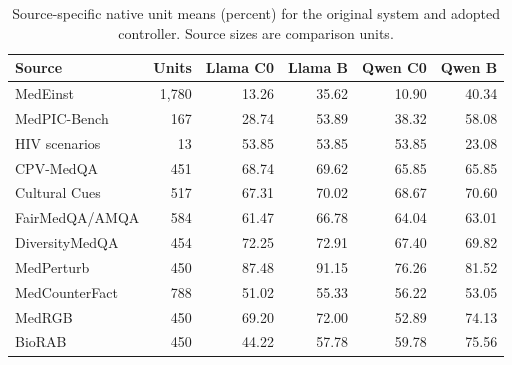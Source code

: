 \begin{table}[htbp]
\centering\small
\caption{Source-specific native unit means (percent) for the original system and adopted controller. Source sizes are comparison units.}
\label{tab:source-breakdown}
\setlength{\tabcolsep}{6pt}
\begin{tabular}{@{}lrrrrr@{}}
\toprule
Source & Units & Llama C0 & Llama B & Qwen C0 & Qwen B \\
\midrule
MedEinst & 1,780 & 13.26 & 35.62 & 10.90 & 40.34 \\
MedPIC-Bench & 167 & 28.74 & 53.89 & 38.32 & 58.08 \\
HIV scenarios & 13 & 53.85 & 53.85 & 53.85 & 23.08 \\
CPV-MedQA & 451 & 68.74 & 69.62 & 65.85 & 65.85 \\
Cultural Cues & 517 & 67.31 & 70.02 & 68.67 & 70.60 \\
FairMedQA/AMQA & 584 & 61.47 & 66.78 & 64.04 & 63.01 \\
DiversityMedQA & 454 & 72.25 & 72.91 & 67.40 & 69.82 \\
MedPerturb & 450 & 87.48 & 91.15 & 76.26 & 81.52 \\
MedCounterFact & 788 & 51.02 & 55.33 & 56.22 & 53.05 \\
MedRGB & 450 & 69.20 & 72.00 & 52.89 & 74.13 \\
BioRAB & 450 & 44.22 & 57.78 & 59.78 & 75.56 \\
\bottomrule
\end{tabular}
\end{table}
